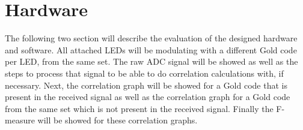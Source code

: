 
\section{Hardware}
\label{sec:hardware-evaluation}

The following two section will describe the evaluation of the designed hardware and software.
All attached LEDs will be modulating with a different Gold code per LED, from the same set.
The raw ADC signal will be showed as well as the steps to process that signal to be able to do correlation calculations with, if necessary.
Next, the correlation graph will be showed for a Gold code that is present in the received signal as well as the correlation graph for a Gold code from the same set which is not present in the received signal.
Finally the F-measure will be showed for these correlation graphs.







